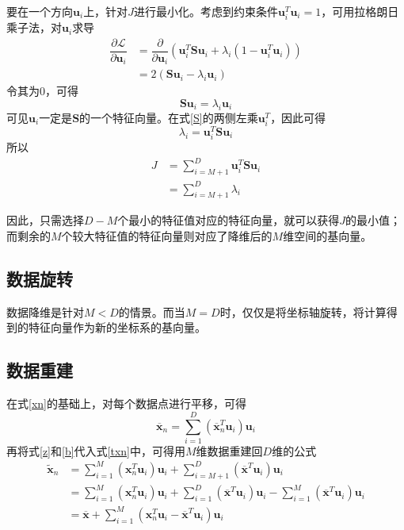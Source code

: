 要在一个方向$\mathbf{u}_i$上，针对$J$进行最小化。考虑到约束条件$\mathbf{u}^T_i\mathbf{u}_i=1$，可用拉格朗日乘子法，对$\mathbf{u}_i$求导
\begin{align}
    \dfrac{\partial\mathcal{L}}{\partial\mathbf{u}_i}
    &= \dfrac{\partial}{\partial\mathbf{u}_i}\left(\mathbf{u}^T_i\mathbf{S}\mathbf{u}_i+\lambda_i\left(1-\mathbf{u}^T_i\mathbf{u}_i\right)\right) \\
    &= 2\left(\mathbf{S}\mathbf{u}_i-\lambda_i\mathbf{u}_i\right)
\end{align}
令其为$0$，可得
\begin{equation}
    \mathbf{S}\mathbf{u}_i=\lambda_i\mathbf{u}_i
    \label{S}
\end{equation}
可见$\mathbf{u}_i$一定是$\mathbf{S}$的一个特征向量。在式\ref{S}的两侧左乘$\mathbf{u}^T_i$，因此可得
\begin{equation}
    \lambda_i=\mathbf{u}^T_i\mathbf{S}\mathbf{u}_i
\end{equation}
所以
\begin{align}
    J
    &= \sum^D_{i=M+1}\mathbf{u}^T_i\mathbf{S}\mathbf{u}_i \\
    &= \sum^D_{i=M+1}\lambda_i
\end{align}

因此，只需选择$D-M$个最小的特征值对应的特征向量，就可以获得$J$的最小值；而剩余的$M$个较大特征值的特征向量则对应了降维后的$M$维空间的基向量。

\subsection{数据旋转}

数据降维是针对$M<D$的情景。而当$M=D$时，仅仅是将坐标轴旋转，将计算得到的特征向量作为新的坐标系的基向量。

\subsection{数据重建}

在式\ref{xn}的基础上，对每个数据点进行平移，可得
\begin{equation}
    \overline{\mathbf{x}}_n=\sum^D_{i=1}\left(\overline{\mathbf{x}}^T_n\mathbf{u}_i\right)\mathbf{u}_i
\end{equation}
再将式\ref{z}和\ref{b}代入式\ref{txn}中，可得用$M$维数据重建回$D$维的公式
\begin{align}
    \tilde{\mathbf{x}}_n
    &= \sum^M_{i=1}\left(\mathbf{x}^T_n\mathbf{u}_i\right)\mathbf{u}_i+\sum^D_{i=M+1}\left(\overline{\mathbf{x}}^T\mathbf{u}_i\right)\mathbf{u}_i \\
    &= \sum^M_{i=1}\left(\mathbf{x}^T_n\mathbf{u}_i\right)\mathbf{u}_i+\sum^D_{i=1}\left(\overline{\mathbf{x}}^T\mathbf{u}_i\right)\mathbf{u}_i-\sum^M_{i=1}\left(\overline{\mathbf{x}}^T\mathbf{u}_i\right)\mathbf{u}_i \\
    &= \overline{\mathbf{x}}+\sum^M_{i=1}\left(\mathbf{x}^T_n\mathbf{u}_i-\overline{\mathbf{x}}^T\mathbf{u}_i\right)\mathbf{u}_i
\end{align}
